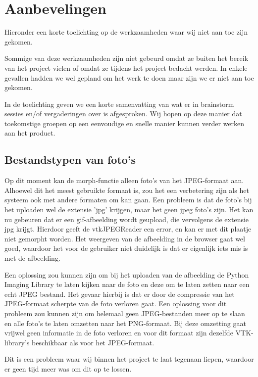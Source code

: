 \section{Aanbevelingen} %
\label{Aanbevelingen}
Hieronder een korte toelichting op de werkzaamheden waar wij niet aan toe zijn gekomen. 

Sommige van deze werkzaamheden zijn niet gebeurd omdat ze buiten het bereik van het project vielen of omdat ze tijdens het project bedacht werden. 
In enkele gevallen hadden we wel gepland om het werk te doen maar zijn we er niet aan toe gekomen.  

In de toelichting geven we een korte samenvatting van wat er in brainstorm sessies en/of vergaderingen over is afgesproken. 
Wij hopen op deze manier dat toekomstige groepen op een eenvoudige en snelle manier kunnen verder werken aan het product.

\subsection{Bestandstypen van foto's} %
Op dit moment kan de morph-functie alleen foto's van het JPEG-formaat aan. 
Alhoewel dit het meest gebruikte formaat is, zou het een verbetering zijn als het systeem ook met andere formaten om kan gaan. 
Een probleem is dat de foto's bij het uploaden wel de extensie 'jpg' krijgen, maar het geen jpeg foto's zijn. 
Het kan nu gebeuren dat er een gif-afbeelding wordt geupload, die vervolgens de extensie jpg krijgt. 
Hierdoor geeft de vtkJPEGReader een error, en kan er met dit plaatje niet gemorpht worden. 
Het weergeven van de afbeelding in de browser gaat wel goed, waardoor het voor de gebruiker niet duidelijk is dat er eigenlijk iets mis is met de afbeelding.

Een oplossing zou kunnen zijn om bij het uploaden van de afbeelding de Python Imaging Library te laten kijken naar de foto en deze om te laten zetten naar een echt JPEG bestand. 
Het gevaar hierbij is dat er door de compressie van het JPEG-formaat scherpte van de foto verloren gaat.
Een oplossing voor dit probleem zou kunnen zijn om helemaal geen JPEG-bestanden meer op te slaan en alle foto's te laten omzetten naar het PNG-formaat. Bij deze omzetting gaat vrijwel geen informatie in de foto verloren en voor dit formaat zijn dezelfde VTK-library's beschikbaar als voor het JPEG-formaat.

Dit is een probleem waar wij binnen het project te laat tegenaan liepen, waardoor er geen tijd meer was om dit op te lossen.

